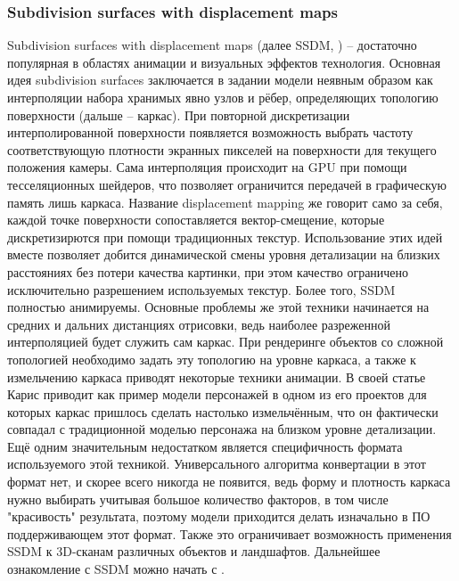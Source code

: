 \documentclass[12pt]{extarticle}
\begin{document}
\subsubsection{Subdivision surfaces with displacement maps}
Subdivision surfaces with displacement maps (далее SSDM, \cite{ssdm}) -- достаточно популярная в областях анимации и визуальных эффектов технология. Основная идея subdivision surfaces заключается в задании модели неявным образом как интерполяции набора хранимых явно узлов и рёбер, определяющих топологию поверхности (дальше -- каркас). При повторной дискретизации интерполированной поверхности появляется возможность выбрать частоту соответствующую плотности экранных пикселей на поверхности для текущего положения камеры. Сама интерполяция происходит на GPU при помощи тесселяционных шейдеров, что позволяет ограничится передачей в графическую память лишь каркаса. Название displacement mapping же говорит само за себя, каждой точке поверхности сопоставляется вектор-смещение, которые дискретизирются при помощи традиционных текстур. Использование этих идей вместе позволяет добится динамической смены уровня детализации на близких расстояниях без потери качества картинки, при этом качество ограничено исключительно разрешением используемых текстур. Более того, SSDM полностью анимируемы. Основные проблемы же этой техники начинается на средних и дальних дистанциях отрисовки, ведь наиболее разреженной интерполяцией будет служить сам каркас. При рендеринге объектов со сложной топологией необходимо задать эту топологию на уровне каркаса, а также к измельчению каркаса приводят некоторые техники анимации. В своей статье Карис приводит как пример модели персонажей в одном из его проектов для которых каркас пришлось сделать настолько измельчённым, что он фактически совпадал с традиционной моделью персонажа на близком уровне детализации. Ещё одним значительным недостатком является специфичность формата используемого этой техникой. Универсального алгоритма конвертации в этот формат нет, и скорее всего никогда не появится, ведь форму и плотность каркаса нужно выбирать учитывая большое количество факторов, в том числе "красивость" результата, поэтому модели приходится делать изначально в ПО поддерживающем этот формат. Также это ограничивает возможность применения SSDM к 3D-сканам различных объектов и ландшафтов. Дальнейшее ознакомление с SSDM можно начать с \cite{ref}.
\end{document}
